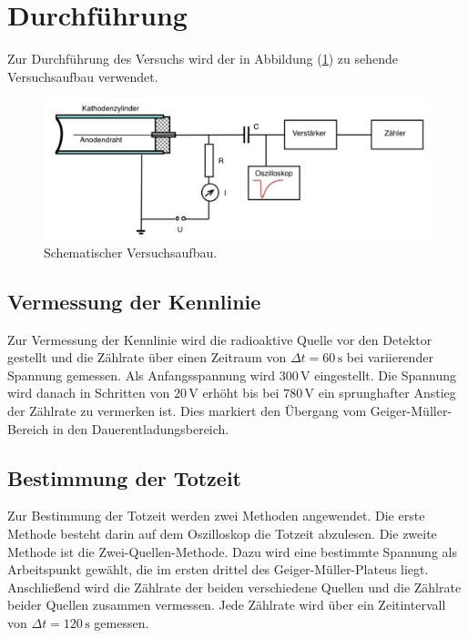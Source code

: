 \section{Durchführung}
\label{sec:Durchführung}
Zur Durchführung des Versuchs wird der in Abbildung (\ref{fig:Versuchsaufbau}) zu sehende Versuchsaufbau
verwendet. 
\begin{figure}[H]
    \centering
    \includegraphics[width=\textwidth]{content/Bilder/Gesamte_Schaltung.jpeg}
    \caption{Schematischer Versuchsaufbau. \cite{anleitungV703}}
    \label{fig:Versuchsaufbau}
\end{figure}
\subsection{Vermessung der Kennlinie}
Zur Vermessung der Kennlinie wird die radioaktive Quelle 
vor den Detektor gestellt und die Zählrate über einen 
Zeitraum von $\Delta t = 60 \, \unit{\second}$ bei variierender
Spannung gemessen. Als Anfangsspannung wird $300 \, \unit{\volt}$
eingestellt. Die Spannung wird danach in Schritten von $20 \, \unit{\volt}$
erhöht bis bei $780 \, \unit{\volt}$ ein sprunghafter Anstieg der
Zählrate zu vermerken ist. Dies markiert den Übergang vom Geiger-Müller-Bereich 
in den Dauerentladungsbereich. 
\subsection{Bestimmung der Totzeit}
Zur Bestimmung der Totzeit werden zwei Methoden angewendet. Die erste Methode besteht 
darin auf dem Oszilloskop die Totzeit abzulesen. 
Die zweite Methode ist die Zwei-Quellen-Methode. Dazu wird eine bestimmte Spannung als
Arbeitspunkt gewählt, die im ersten drittel des Geiger-Müller-Plateus liegt. Anschließend
wird die Zählrate der beiden verschiedene Quellen und die Zählrate beider Quellen 
zusammen vermessen. Jede Zählrate wird über ein Zeitintervall von 
$\Delta t = 120 \, \unit{\second}$ gemessen. 